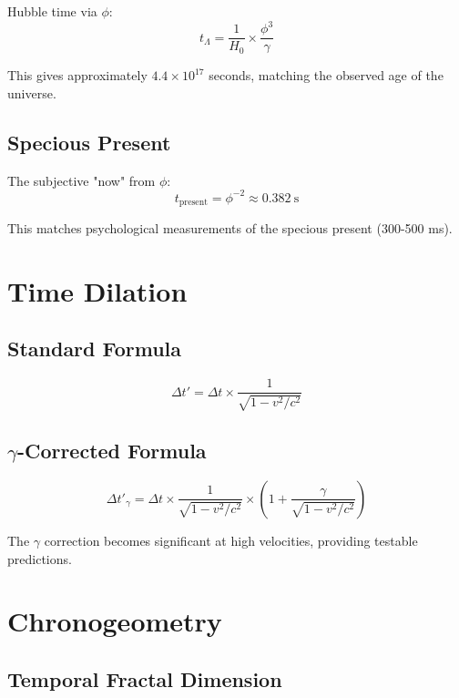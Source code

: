 \documentclass[12pt,a4paper]{article}
\begin{document}
Hubble time via $\phi$:
\begin{equation}
t_\Lambda = \frac{1}{H_0} \times \frac{\phi^3}{\gamma}
\end{equation}

This gives approximately $4.4 \times 10^{17}$ seconds, matching the observed age of the universe.

\subsection{Specious Present}

The subjective "now" from $\phi$:
\begin{equation}
t_{\text{present}} = \phi^{-2} \approx 0.382~\text{s}
\end{equation}

This matches psychological measurements of the specious present (300-500 ms).

\section{Time Dilation}

\subsection{Standard Formula}

\begin{equation}
\Delta t' = \Delta t \times \frac{1}{\sqrt{1 - v^2/c^2}}
\end{equation}

\subsection{$\gamma$-Corrected Formula}

\begin{equation}
\Delta t'_\gamma = \Delta t \times \frac{1}{\sqrt{1 - v^2/c^2}} \times \left(1 + \frac{\gamma}{\sqrt{1 - v^2/c^2}}\right)
\end{equation}

The $\gamma$ correction becomes significant at high velocities, providing testable predictions.

\section{Chronogeometry}

\subsection{Temporal Fractal Dimension}
\end{document}
